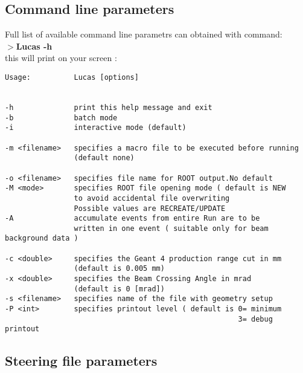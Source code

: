 \documentclass[10pt,notitlepage,twoside,a4paper]{scrartcl}
\begin{document}
 \subsection{Command line parameters}\label{params}
Full list of available command line parametrs can obtained with command:\\
{\bf {$> $Lucas -h}}\\
this will print on your screen :\\
\begin{verbatim}
Usage:          Lucas [options]


-h              print this help message and exit
-b              batch mode
-i              interactive mode (default)

-m <filename>   specifies a macro file to be executed before running
                (default none)

-o <filename>   specifies file name for ROOT output.No default
-M <mode>       specifies ROOT file opening mode ( default is NEW
                to avoid accidental file overwriting
                Possible values are RECREATE/UPDATE
-A              accumulate events from entire Run are to be
                written in one event ( suitable only for beam background data )

-c <double>     specifies the Geant 4 production range cut in mm 
                (default is 0.005 mm)
-x <double>     specifies the Beam Crossing Angle in mrad
                (default is 0 [mrad])
-s <filename>   specifies name of the file with geometry setup
-P <int>        specifies printout level ( default is 0= minimum
                                                      3= debug printout
\end{verbatim}

\newpage
 \subsection{Steering file parameters}\label{steer}
\end{document}
